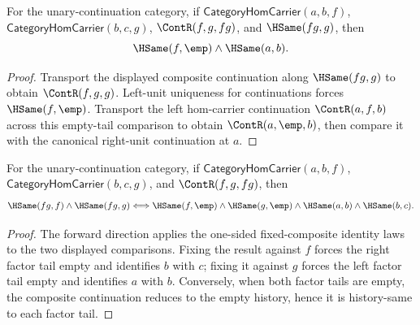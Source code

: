 \begin{theorem}
\label{thm:category-hom-carrier-comp-right-tail-fixed-left-identity}
For the unary-continuation category, if
$\mathsf{CategoryHomCarrier}(a,b,f)$,
$\mathsf{CategoryHomCarrier}(b,c,g)$, $\ContR(f,g,fg)$, and
$\HSame(fg,g)$, then
$$
\HSame(f,\emp)\wedge\HSame(a,b).
$$
\end{theorem}
\begin{proof}
Transport the displayed composite continuation along $\HSame(fg,g)$ to obtain
$\ContR(f,g,g)$. Left-unit uniqueness for continuations forces
$\HSame(f,\emp)$. Transport the left hom-carrier continuation
$\ContR(a,f,b)$ across this empty-tail comparison to obtain
$\ContR(a,\emp,b)$, then compare it with the canonical right-unit continuation
at $a$.
\end{proof}

\begin{theorem}
\label{thm:category-hom-carrier-composite-result-fixed-both-identity}
For the unary-continuation category, if
$\mathsf{CategoryHomCarrier}(a,b,f)$,
$\mathsf{CategoryHomCarrier}(b,c,g)$, and $\ContR(f,g,fg)$, then
$$
\HSame(fg,f)\wedge\HSame(fg,g)
\Longleftrightarrow
\HSame(f,\emp)\wedge\HSame(g,\emp)\wedge\HSame(a,b)\wedge\HSame(b,c).
$$
\end{theorem}
\begin{proof}
The forward direction applies the one-sided fixed-composite identity laws to
the two displayed comparisons. Fixing the result against $f$ forces the right
factor tail empty and identifies $b$ with $c$; fixing it against $g$ forces the
left factor tail empty and identifies $a$ with $b$. Conversely, when both
factor tails are empty, the composite continuation reduces to the empty
history, hence it is history-same to each factor tail.
\end{proof}

